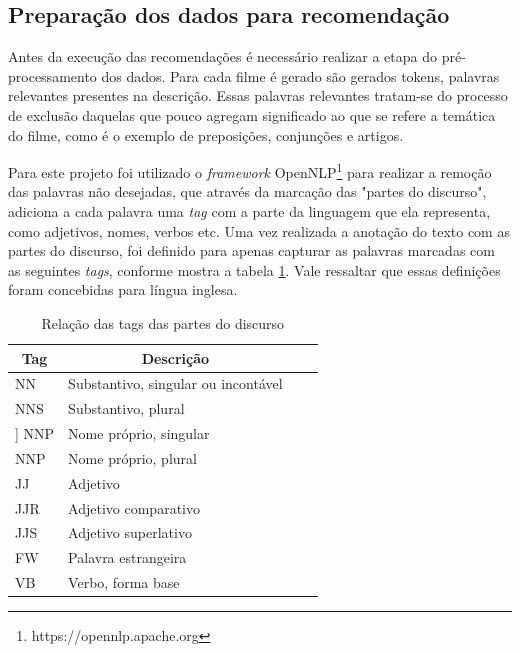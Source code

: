 \subsection{Preparação dos dados para recomendação}

Antes da execução das recomendações é necessário realizar a etapa do pré-processamento dos dados. Para cada filme é gerado são gerados tokens, palavras relevantes presentes na descrição. Essas palavras relevantes tratam-se do processo de exclusão daquelas que pouco agregam significado ao que se refere a temática do filme, como é o exemplo de preposições, conjunções e artigos. 

Para este projeto foi utilizado o \textit{framework} OpenNLP\footnote{https://opennlp.apache.org} para realizar a remoção das palavras não desejadas, que através da marcação das "partes do discurso", adiciona a cada palavra uma \textit{tag} com a parte da linguagem que ela representa, como adjetivos, nomes, verbos etc. Uma vez realizada a anotação do texto com as partes do discurso, foi definido para apenas capturar as palavras marcadas com as seguintes \textit{tags}, conforme mostra a tabela \ref{tab:nlp_tags}. Vale ressaltar que essas definições foram concebidas para língua inglesa.

\begin{table}[H]
	\label{tab:nlp_tags}
	\centering
	\caption{Relação das tags das partes do discurso}
	\def\arraystretch{1.3} %
	\begin{tabular}{| m{1.3cm} | m{9.4cm}| c | m{2cm}}
		\hline
		\multicolumn{1}{|c|}{\bfseries Tag} & \multicolumn{1}{c|}{\bfseries Descrição} \\ \hline
		NN & Substantivo, singular ou incontável \\ \hline 	
		NNS	& Substantivo, plural \\ \hline]
		NNP	& Nome próprio, singular \\ \hline
		NNP	& Nome próprio, plural \\ \hline
		JJ & Adjetivo \\ \hline
		JJR & Adjetivo comparativo \\ \hline
		JJS & Adjetivo superlativo \\ \hline
		FW & Palavra estrangeira \\ \hline
		VB & Verbo, forma base \\ \hline
	\end{tabular}
\end{table}

